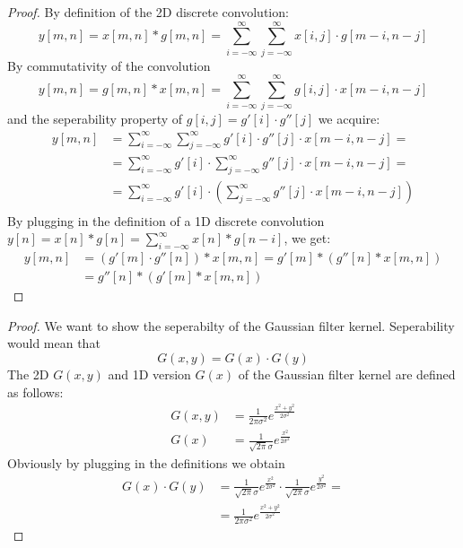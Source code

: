 \documentclass[journal]{IEEEtran}
\begin{document}
\begin{appendix}
	\begin{proof}
		By definition of the 2D discrete convolution:
		\[
			y[m,n] = x[m,n]*g[m,n] = \sum \limits_{i=-\infty}^{\infty} \sum \limits_{j=-\infty}^{\infty} x[i, j]\cdot g[m-i, n -j]
		\]
		By commutativity of the convolution
		\[
			y[m,n] = g[m,n]* x[m,n]= \sum \limits_{i=-\infty}^{\infty} \sum \limits_{j=-\infty}^{\infty} g[i, j]\cdot x[m-i, n -j]
		\]
		and the seperability property of $g[i, j] = g'[i] \cdot g''[j]$ we acquire:
		\begin{align*}
			y[m,n] &=\sum \limits_{i=-\infty}^{\infty} \sum \limits_{j=-\infty}^{\infty} g'[i] \cdot g''[j] \cdot x[m-i, n -j] = \\
			&=\sum \limits_{i=-\infty}^{\infty} g'[i] \cdot \sum \limits_{j=-\infty}^{\infty}  g''[j] \cdot x[m-i, n -j] = \\
			&=\sum \limits_{i=-\infty}^{\infty} g'[i] \cdot \left(\sum \limits_{j=-\infty}^{\infty}  g''[j] \cdot x[m-i, n -j] \right) \\
		\end{align*}
		By plugging in the definition of a 1D discrete convolution $y[n] = x[n]*g[n] = \sum \limits_{i=-\infty}^{\infty} x[n]*g[n-i]$, we get:
		\begin{align*}
			y[m, n] &= (g'[m] \cdot g''[n])*x[m, n] = g'[m]*(g''[n]*x[m,n]) \\
			&=  g''[n]*(g'[m]*x[m,n])
		\end{align*}
	\end{proof}
	\begin{proof}
		We want to show the seperabilty of the Gaussian filter kernel. Seperability would mean that
		\[
		G(x,y) = G(x)\cdot G(y)
		\]
		The 2D $G(x,y)$ and 1D version $G(x)$  of the Gaussian filter kernel are defined as follows:
		\begin{align*}
			G(x,y) &= \frac{1}{2\pi \sigma^2}e^{\frac{x^2+y^2}{2\sigma^2}} \\
			G(x) &= \frac{1}{\sqrt{2\pi} \sigma}e^{\frac{x^2}{2\sigma^2}}
		\end{align*}
		Obviously by plugging in the definitions we obtain
		\begin{align*}
			G(x)\cdot G(y) &= \frac{1}{\sqrt{2\pi} \sigma}e^{\frac{x^2}{2\sigma^2}} \cdot \frac{1}{\sqrt{2\pi} \sigma}e^{\frac{y^2}{2\sigma^2}} = \\
			&= \frac{1}{2\pi \sigma^2}e^{\frac{x^2+y^2}{2\sigma^2}}
		\end{align*}


\end{proof}
\end{appendix}
\end{document}
